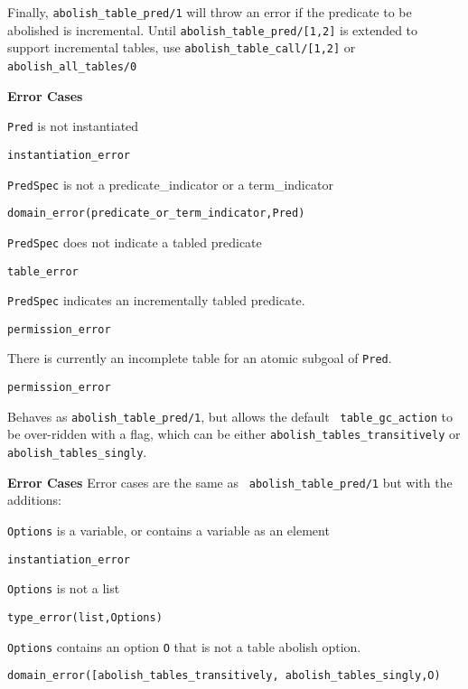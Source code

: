 \begin{description}
\begin{description}
Finally, {\tt abolish\_table\_pred/1} will throw an error if the
predicate to be abolished is incremental.  
%
%
Until {\tt abolish\_table\_pred/[1,2]} is extended to support
incremental tables, use {\tt abolish\_table\_call/[1,2]} or {\tt
  abolish\_all\_tables/0}~\

{\bf Error Cases}
\bi
%
\item {\tt Pred} is not instantiated
 \bi 
 \item 	{\tt instantiation\_error}
 \ei
%
\item {\tt PredSpec} is not a predicate\_indicator or a term\_indicator
 \bi
 \item 	{\tt domain\_error(predicate\_or\_term\_indicator,Pred)}
 \ei
%
\item {\tt PredSpec} does not indicate a tabled predicate
  \bi
 \item 	{\tt table\_error}
 \ei
%
\item {\tt PredSpec} indicates an incrementally tabled predicate.  
\bi
 \item 	{\tt permission\_error}
 \ei
\item There is currently an incomplete table for an atomic subgoal of
  {\tt Pred}.
\bi
 \item 	{\tt permission\_error}
 \ei
%
\ei

%
Behaves as {\tt abolish\_table\_pred/1}, but allows the default {\tt
  table\_gc\_action} to be over-ridden with a flag, which can be either 
{\tt abolish\_tables\_transitively} or {\tt abolish\_tables\_singly}.

{\bf Error Cases} Error cases are the same as {\tt
  abolish\_table\_pred/1} but with the additions: 
\bi
\item {\tt Options} is a variable, or contains a variable as an element
\bi
\item {\tt instantiation\_error}
\ei
\item {\tt Options} is not a list
\bi
\item {\tt type\_error(list,Options)}
\ei
\item {\tt Options} contains an option {\tt O} that is not a
  table abolish option.
\bi
\item {\tt domain\_error([abolish\_tables\_transitively, abolish\_tables\_singly,O)}
\ei
\ei


\end{description}
\end{description}
